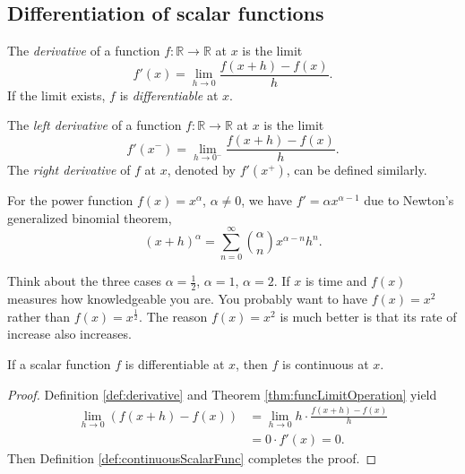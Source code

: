 \subsection{Differentiation of scalar functions}
\label{sec:diff-funct}

\begin{defn}
  \label{def:derivative}
  The \emph{derivative}
   of a function $f: \mathbb{R}\rightarrow \mathbb{R}$
   at $x$ is the limit
   \begin{equation}
     \label{eq:derivative}
     f'(x)=\lim_{h\rightarrow 0} \frac{f(x+h)-f(x)}{h}.
   \end{equation}
  If the limit exists, $f$ is \emph{differentiable} at $x$.
\end{defn}

\begin{defn}
  \label{def:oneSidedDerivative}
  The \emph{left derivative}
   of a function $f: \mathbb{R}\rightarrow \mathbb{R}$
   at $x$ is the limit
   \begin{equation}
     \label{eq:derivative}
     f'(x^{-})=\lim_{h\rightarrow 0^{-}} \frac{f(x+h)-f(x)}{h}.
   \end{equation}
   The \emph{right derivative} of $f$ at $x$,
   denoted by $f'(x^{+})$, can be defined similarly.
\end{defn}

\begin{exm}
  For the power function \mbox{$f(x)=x^{\alpha}$}, $\alpha\neq 0$,
   we have $f'=\alpha x^{\alpha-1}$
   due to
   Newton's generalized binomial theorem, 
  \begin{equation*}
    (x+h)^{\alpha}=\sum_{n=0}^{\infty}{\alpha \choose n}x^{\alpha-n}h^n.
  \end{equation*}
\end{exm}

\begin{rem}
  Think about the three cases $\alpha=\frac{1}{2}$,
  $\alpha=1$, $\alpha=2$.
  If $x$ is time and $f(x)$ measures how knowledgeable you are.
  You probably want to have $f(x)=x^2$ rather than
  $f(x)=x^{\frac{1}{2}}$.
  The reason $f(x)=x^2$ is much better is that
  its rate of increase also increases.
\end{rem}

\begin{lem}
  \label{lem:differentiabilityImplyCoutinuity}
  If a scalar function $f$ is differentiable at $x$,
  then $f$ is continuous at $x$.
\end{lem}
\begin{proof}
  Definition \ref{def:derivative} and
  Theorem \ref{thm:funcLimitOperation} yield
  \begin{align*}
    \lim_{h\rightarrow 0} \left( f(x+h)-f(x)  \right)
    &= \lim_{h\rightarrow0} h\cdot \frac{f(x+h)-f(x)}{h}  \\
    &=0\cdot f'(x)=0.
  \end{align*}
  Then Definition \ref{def:continuousScalarFunc} completes the proof.
\end{proof}

